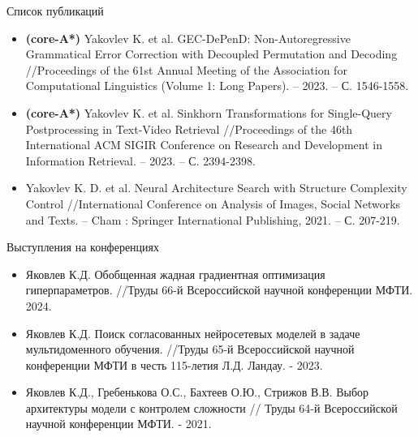 \documentclass[aspectratio=169]{beamer}
\begin{document}
\begin{frame}{Список публикаций}
  \begin{small}
  \begin{itemize}
    \item \textbf{(core-A*)} Yakovlev K. et al. GEC-DePenD: Non-Autoregressive Grammatical Error Correction with Decoupled Permutation and Decoding //Proceedings of the 61st Annual Meeting of the Association for Computational Linguistics (Volume 1: Long Papers). – 2023. – С. 1546-1558.
    \item \textbf{(core-A*)} Yakovlev K. et al. Sinkhorn Transformations for Single-Query Postprocessing in Text-Video Retrieval //Proceedings of the 46th International ACM SIGIR Conference on Research and Development in Information Retrieval. – 2023. – С. 2394-2398.
    \item Yakovlev K. D. et al. Neural Architecture Search with Structure Complexity Control //International Conference on Analysis of Images, Social Networks and Texts. – Cham : Springer International Publishing, 2021. – С. 207-219.
  \end{itemize}
  \end{small}
\end{frame}


\begin{frame}{Выступления на конференциях}
  \begin{itemize}
  \item Яковлев К.Д. Обобщенная жадная градиентная оптимизация гиперпараметров. //Труды
  66-й Всероссийской
  научной конференции
  МФТИ. 2024.
  \item Яковлев К.Д. Поиск согласованных нейросетевых моделей в задаче мультидоменного обучения. //Труды
  65-й Всероссийской
  научной конференции
  МФТИ в честь 115-летия
  Л.Д. Ландау. - 2023.
  \item Яковлев К.Д., Гребенькова О.С., Бахтеев О.Ю., Стрижов В.В. Выбор архитектуры модели с контролем сложности //
  Труды
  64-й Всероссийской
  научной конференции
  МФТИ. - 2021.
  \end{itemize}
  
\end{frame}

\end{document}

